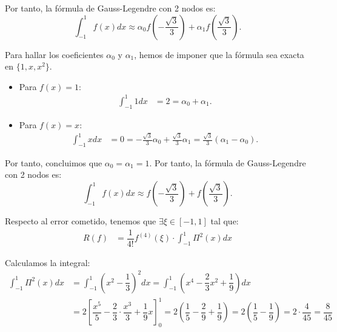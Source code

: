 \begin{ejercicio}
\begin{enumerate}
        Por tanto, la fórmula de Gauss-Legendre con 2 nodos es:
        \begin{equation*}
            \int_{-1}^{1} f(x) dx \approx \alpha_0 f\left(-\frac{\sqrt{3}}{3}\right) + \alpha_1 f\left(\frac{\sqrt{3}}{3}\right).
        \end{equation*}

        Para hallar los coeficientes $\alpha_0$ y $\alpha_1$, hemos de imponer que la fórmula sea exacta en $\{1,x,x^2\}$.
        \begin{itemize}
            \item Para $f(x) = 1$:
            \begin{align*}
                \int_{-1}^{1} 1 dx &= 2 = \alpha_0 + \alpha_1.
            \end{align*}
            \item Para $f(x) = x$:
            \begin{align*}
                \int_{-1}^{1} x dx &= 0 = -\frac{\sqrt{3}}{3}\alpha_0 + \frac{\sqrt{3}}{3}\alpha_1
                = \frac{\sqrt{3}}{3}(\alpha_1 - \alpha_0).
            \end{align*}
        \end{itemize}

        Por tanto, concluimos que $\alpha_0 = \alpha_1 = 1$. Por tanto, la fórmula de Gauss-Legendre con 2 nodos es:
        \begin{equation*}
            \int_{-1}^{1} f(x) dx \approx f\left(-\frac{\sqrt{3}}{3}\right) + f\left(\frac{\sqrt{3}}{3}\right).
        \end{equation*}


        Respecto al error cometido, tenemos que $\exists \xi \in [-1, 1]$ tal que:
        \begin{align*}
            R(f) &= \dfrac{1}{4!}f^{(4)}(\xi) \cdot \int_{-1}^{1} \Pi^2(x) dx
        \end{align*}

        Calculamos la integral:
        \begin{align*}
            \int_{-1}^{1} \Pi^2(x) dx &= \int_{-1}^{1} \left(x^2 - \dfrac{1}{3}\right)^2 dx = \int_{-1}^{1} \left(x^4 - \dfrac{2}{3}x^2 + \dfrac{1}{9}\right) dx\\
            &= 2\left[\dfrac{x^5}{5} - \dfrac{2}{3}\cdot \dfrac{x^3}{3} + \dfrac{1}{9}x\right]_{0}^{1} = 2\left(\dfrac{1}{5} - \dfrac{2}{9} + \dfrac{1}{9}\right) = 2\left(\dfrac{1}{5} - \dfrac{1}{9}\right) = 2\cdot \dfrac{4}{45} = \dfrac{8}{45}
        \end{align*}


\end{enumerate}
\end{ejercicio}
